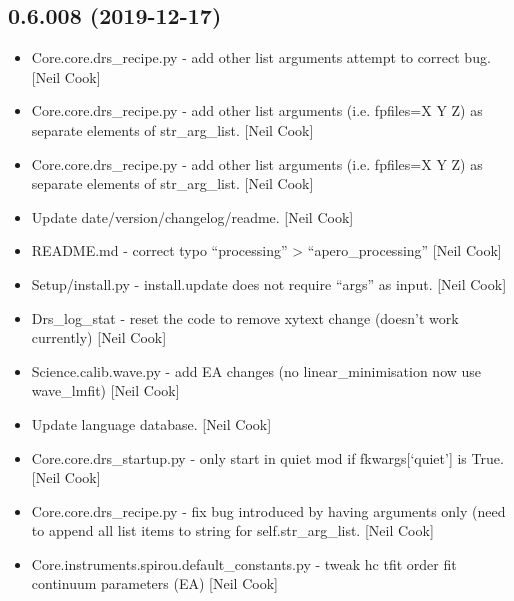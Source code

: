 \documentclass[a4paper,10pt,english]{report}
\begin{document}
\subsection{0.6.008 (2019-12-17)}
\label{\detokenize{misc/changelog:id9}}\begin{itemize}
\item {} 
Core.core.drs\_recipe.py - add other list arguments \textendash{} attempt to
correct bug. {[}Neil Cook{]}

\item {} 
Core.core.drs\_recipe.py - add other list arguments (i.e. \textendash{}fpfiles=X Y
Z) as separate elements of str\_arg\_list. {[}Neil Cook{]}

\item {} 
Core.core.drs\_recipe.py - add other list arguments (i.e. \textendash{}fpfiles=X Y
Z) as separate elements of str\_arg\_list. {[}Neil Cook{]}

\item {} 
Update date/version/changelog/readme. {[}Neil Cook{]}

\item {} 
README.md - correct typo “processing” \textendash{}\textgreater{} “apero\_processing” {[}Neil
Cook{]}

\item {} 
Setup/install.py - install.update does not require “args” as input.
{[}Neil Cook{]}

\item {} 
Drs\_log\_stat - reset the code to remove xytext change (doesn’t work
currently) {[}Neil Cook{]}

\item {} 
Science.calib.wave.py - add EA changes (no linear\_minimisation now use
wave\_lmfit) {[}Neil Cook{]}

\item {} 
Update language database. {[}Neil Cook{]}

\item {} 
Core.core.drs\_startup.py - only start in quiet mod if fkwargs{[}‘quiet’{]}
is True. {[}Neil Cook{]}

\item {} 
Core.core.drs\_recipe.py - fix bug introduced by having \textendash{}arguments
only (need to append all list items to string for self.str\_arg\_list.
{[}Neil Cook{]}

\item {} 
Core.instruments.spirou.default\_constants.py - tweak hc tfit order fit
continuum parameters (EA) {[}Neil Cook{]}


\end{itemize}
\end{document}

